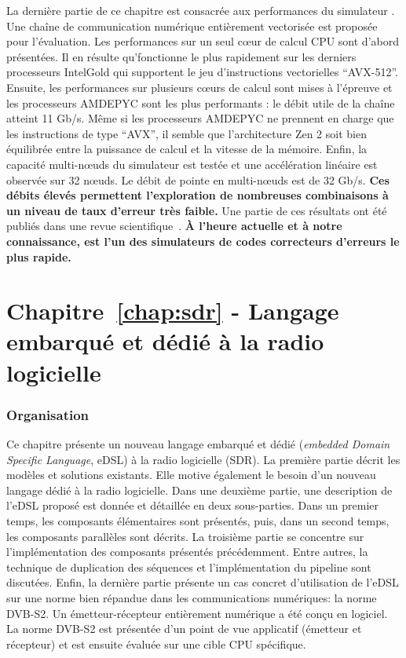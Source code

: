 La dernière partie de ce chapitre est consacrée aux performances du simulateur
\AFFECT. Une chaîne de communication numérique entièrement vectorisée est
proposée pour l'évaluation. Les performances sur un seul cœur de calcul CPU sont
d'abord présentées. Il en résulte qu'\AFFECT fonctionne le plus rapidement sur
les derniers processeurs Intel\R Gold qui supportent le jeu d'instructions
vectorielles ``AVX-512''. Ensuite, les performances sur plusieurs cœurs de
calcul sont mises à l'épreuve et les processeurs AMD\R EPYC sont les plus
performants : le débit utile de la chaîne atteint 11 Gb/s. Même si les
processeurs AMD\R EPYC ne prennent en charge que les instructions de type
``AVX'', il semble que l'architecture Zen 2 soit bien équilibrée entre la
puissance de calcul et la vitesse de la mémoire. Enfin, la capacité multi-nœuds
du simulateur \AFFECT est testée et une accélération linéaire est observée sur
32 nœuds. Le débit de pointe en multi-nœuds est de 32 Gb/s. \textbf{Ces débits
élevés permettent l'exploration de nombreuses combinaisons à un niveau de taux
d'erreur très faible.} Une partie de ces résultats ont été publiés dans une
revue scientifique~\cite{Cassagne2019a}. \textbf{À l'heure actuelle et à notre
connaissance, \AFFECT est l'un des simulateurs de codes correcteurs d'erreurs
le plus rapide.}

\section*{Chapitre~\ref{chap:sdr} - Langage embarqué et dédié à la radio logicielle}

\subsubsection*{Organisation}

Ce chapitre présente un nouveau langage embarqué et dédié (\emph{embedded Domain
Specific Language}, eDSL) à la radio logicielle (SDR). La première partie
décrit les modèles et solutions existants. Elle motive également le besoin
d'un nouveau langage dédié à la radio logicielle. Dans une deuxième partie, une
description de l'eDSL proposé est donnée et détaillée en deux sous-parties. Dans
un premier temps, les composants élémentaires sont présentés, puis, dans un
second temps, les composants parallèles sont décrits. La troisième partie se
concentre sur l'implémentation des composants présentés précédemment. Entre
autres, la technique de duplication des séquences et l'implémentation du
pipeline sont discutées. Enfin, la dernière partie présente un cas concret
d'utilisation de l'eDSL sur une norme bien répandue dans les communications
numériques: la norme DVB-S2. Un émetteur-récepteur entièrement numérique a été
conçu en logiciel. La norme DVB-S2 est présentée d'un point de vue applicatif
(émetteur et récepteur) et est ensuite évaluée sur une cible CPU spécifique.

